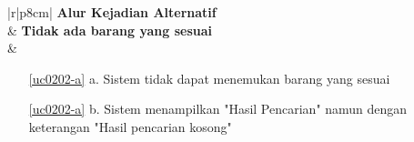 \begin{table}[H]
\begin{tabular}{|r|p{8cm}|}
			{\textbf{Alur Kejadian Alternatif}} 
			\\ \hline
			& \textbf{Tidak ada barang yang sesuai}
			\\ \hline
		 & 
			\begin{itemize}
				\item[\ref{uc0202-a}]a. Sistem tidak dapat menemukan barang yang sesuai
				\item[\ref{uc0202-a}]b. Sistem menampilkan "Hasil Pencarian" namun dengan keterangan "Hasil pencarian kosong"
			\end{itemize}
			\\ \hline
	\end{tabular}
\end{table}	
